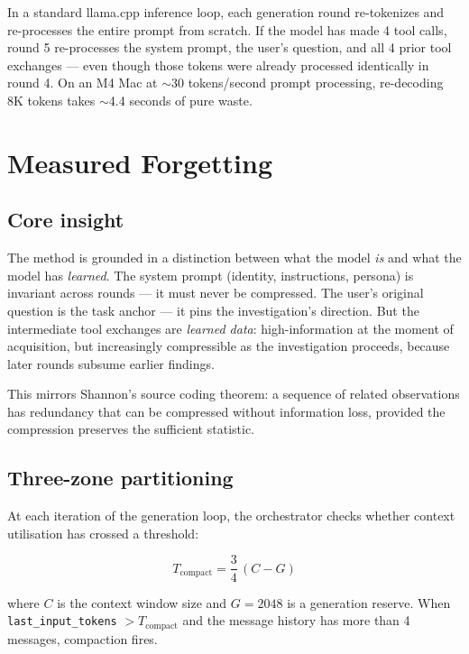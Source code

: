 \documentclass[11pt,a4paper]{article}
\begin{document}
In a standard llama.cpp inference loop, each generation round re-tokenizes and re-processes the entire prompt from scratch. If the model has made 4 tool calls, round 5 re-processes the system prompt, the user's question, and all 4 prior tool exchanges --- even though those tokens were already processed identically in round 4. On an M4 Mac at $\sim$30 tokens/second prompt processing, re-decoding 8K tokens takes $\sim$4.4 seconds of pure waste.

\section{Measured Forgetting}

\subsection{Core insight}

The method is grounded in a distinction between what the model \emph{is} and what the model has \emph{learned}. The system prompt (identity, instructions, persona) is invariant across rounds --- it must never be compressed. The user's original question is the task anchor --- it pins the investigation's direction. But the intermediate tool exchanges are \emph{learned data}: high-information at the moment of acquisition, but increasingly compressible as the investigation proceeds, because later rounds subsume earlier findings.

This mirrors Shannon's source coding theorem: a sequence of related observations has redundancy that can be compressed without information loss, provided the compression preserves the sufficient statistic.

\subsection{Three-zone partitioning}

At each iteration of the generation loop, the orchestrator checks whether context utilisation has crossed a threshold:

\begin{equation}
T_{\text{compact}} = \frac{3}{4}\,(C - G)
\label{eq:threshold}
\end{equation}

\noindent where $C$ is the context window size and $G = 2048$ is a generation reserve. When \texttt{last\_input\_tokens} $> T_{\text{compact}}$ and the message history has more than 4 messages, compaction fires.
\end{document}
